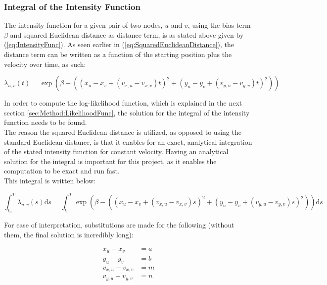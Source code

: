 
\subsubsection{Integral of the Intensity Function}
\label{sec:Method:IntensityFunc:IntegralIntensityFunc}

The intensity function for a given pair of two nodes, $u$ and $v$, using the bias term $\beta$ and squared Euclidean distance as distance term, is as stated above given by (\ref{eq:IntensityFunc}).
As seen earlier in (\ref{eq:SquaredEuclideanDistance}), the distance term can be written as a function of the starting position plus the velocity over time, as such:

\begin{equation}
    \lambda_{u,v}(t)
    =
    \exp \left(\beta - \left((x_u - x_v + (v_{x,u} - v_{x,v})t)^2 + (y_u - y_v + ( v_{y,u} - v_{y,v})t)^2\right)\right)
\end{equation}

In order to compute the log-likelihood function, which is explained in the next section \ref{sec:Method:LikelihoodFunc}, the solution for the integral of the intensity function needs to be found. 
\\
The reason the squared Euclidean distance is utilized, as opposed to using the standard Euclidean distance, is that it enables for an exact, analytical integration of the stated intensity function for constant velocity.
Having an analytical solution for the integral is important for this project, as it enables the computation to be exact and run fast.
\\
This integral is written below:

\begin{equation}
    \int_{t_0}^T \lambda_{u,v}(s) \mathrm{d}s 
    =
    \int_{t_0}^T \exp \left(\beta - \left((x_u - x_v + (v_{x,u} - v_{x,v})s)^2 + (y_u - y_v + ( v_{y,u} - v_{y,v})s)^2\right)\right) \mathrm{d}s
\end{equation}

For ease of interpretation, substitutions are made for the following (without them, the final solution is incredibly long):

\begin{align}
    x_u - x_v &= a
    \\
    y_u - y_v &= b
    \\
    v_{x,u} - v_{x,v} &= m
    \\
    v_{y,u} - v_{y,v} &= n
\end{align}

